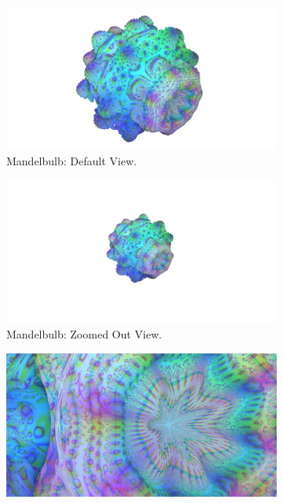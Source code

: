 \begin{figure}[ht]
	\centering

	\begin{subfigure}[c]{0.45\linewidth}
		\includegraphics[width=\linewidth, frame]{Images/Results/Mandelbulb-View-01-Default}
		\caption{Mandelbulb: Default View.}
		\label{figure:mandelbulb-view-01-default}
	\end{subfigure}
	\hfill
	\begin{subfigure}[c]{0.45\linewidth}
		\includegraphics[width=\linewidth, frame]{Images/Results/Mandelbulb-View-02-Empty-Space}
		\caption{Mandelbulb: Zoomed Out View.}
		\label{figure:mandelbulb-view-02-empty-space}
	\end{subfigure}
	\hfill
	\begin{subfigure}[c]{0.45\linewidth}
		\includegraphics[width=\linewidth, frame]{Images/Results/Mandelbulb-View-03-No-Space}

\end{subfigure}
\end{figure}
